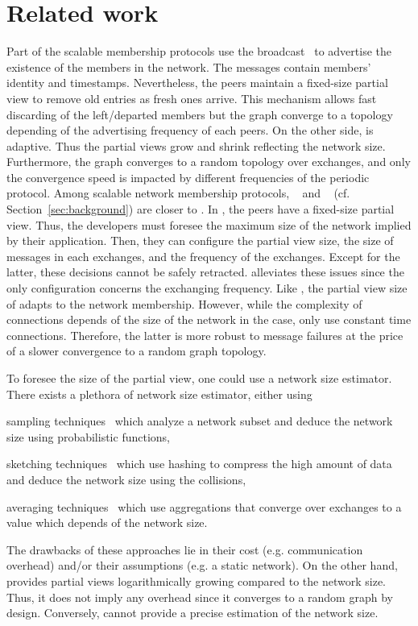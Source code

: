 
\section{Related work}
\label{sec:relatedwork}

Part of the scalable membership protocols use the
broadcast~\cite{eugster2003lightweight, tolgyeski2009adaptive} to advertise the
existence of the members in the network. The messages contain members' identity
and timestamps. Nevertheless, the peers maintain a fixed-size partial view to
remove old entries as fresh ones arrive. This mechanism allows fast discarding
of the left/departed members but the graph converge to a topology depending of
the advertising frequency of each peers. On the other side, \SCAMPLON{} is
adaptive. Thus the partial views grow and shrink reflecting the network
size. Furthermore, the graph converges to a random topology over exchanges, and
only the convergence speed is impacted by different frequencies of the periodic
protocol. Among scalable network membership protocols,
\CYCLON{}~\cite{voulgaris2005cyclon} and \SCAMP{}~\cite{ganesh2003peer}
(cf. Section~\ref{sec:background}) are closer to \SCAMPLON{}. In \CYCLON{}, the
peers have a fixed-size partial view. Thus, the developers must foresee the
maximum size of the network implied by their application. Then, they can
configure the partial view size, the size of messages in each exchanges, and
the frequency of the exchanges. Except for the latter, these decisions cannot
be safely retracted.  \SCAMPLON{} alleviates these issues since the only
configuration concerns the exchanging frequency. Like \SCAMP{}, the partial
view size of \SCAMPLON{} adapts to the network membership. However, while the
complexity of connections depends of the size of the network in the \SCAMP{}
case, \SCAMPLON{} only use constant time connections. Therefore, the latter is
more robust to message failures at the price of a slower convergence to a
random graph topology.

To foresee the size of the partial view, one could use a network size
estimator. There exists a plethora of network size estimator, either using
\begin{inparaenum}[(i)]
\item sampling techniques~\cite{mane05network, ganesh2007peer,
    kostoulas2007active} which analyze a network subset and deduce the network
  size using probabilistic functions,
\item sketching techniques~\cite{flajolet2008hyperloglog, baquero2012extrema}
  which use hashing to compress the high amount of data and deduce the network
  size using the collisions,
\item averaging techniques~\cite{jelasity2004epidemic} which use aggregations
  that converge over exchanges to a value which depends of the network size.
\end{inparaenum}
The drawbacks of these approaches lie in their cost (e.g. communication
overhead) and/or their assumptions (e.g. a static network). On the other hand,
\SCAMPLON{} provides partial views logarithmically growing compared to the
network size. Thus, it does not imply any overhead since it converges to a
random graph by design. Conversely, \SCAMPLON{} cannot provide a precise
estimation of the network size.

